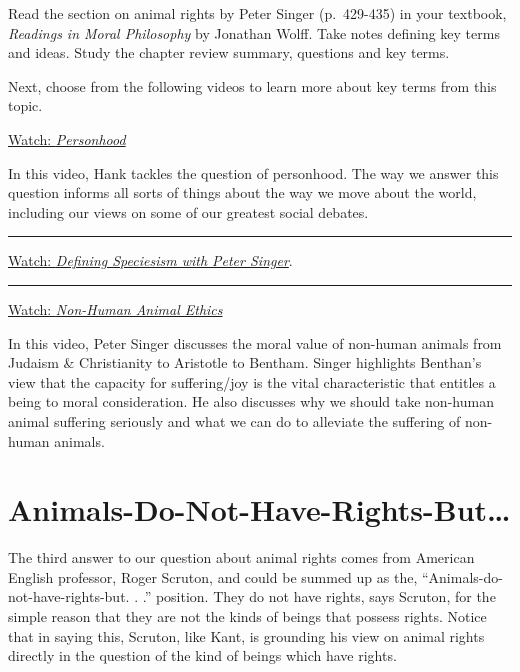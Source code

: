 \documentclass[
]{book}
\begin{document}
\begin{reflect}
Read the section on animal rights by Peter Singer (p.~429-435) in your textbook, \emph{Readings in Moral Philosophy} by Jonathan Wolff. Take notes defining key terms and ideas. Study the chapter review summary, questions and key terms.

Next, choose from the following videos to learn more about key terms from this topic.

\href{https://www.youtube.com/watch?v=GxM9BZeRrUI}{Watch: \emph{Personhood}}

In this video, Hank tackles the question of personhood. The way we answer this question informs all sorts of things about the way we move about the world, including our views on some of our greatest social debates.

\begin{center}\rule{0.5\linewidth}{0.5pt}\end{center}

\href{https://www.youtube.com/watch?v=k57F49ymmQg}{Watch: \emph{Defining Speciesism with Peter Singer}}.

\begin{center}\rule{0.5\linewidth}{0.5pt}\end{center}

\href{https://www.youtube.com/watch?v=TgRoZVT6kYc}{Watch: \emph{Non-Human Animal Ethics}}

In this video, Peter Singer discusses the moral value of non-human animals from Judaism \& Christianity to Aristotle to Bentham. Singer highlights Benthan's view that the capacity for suffering/joy is the vital characteristic that entitles a being to moral consideration. He also discusses why we should take non-human animal suffering seriously and what we can do to alleviate the suffering of non-human animals.
\end{reflect}

\hypertarget{animals-do-not-have-rights-but}{%
\section{Animals-Do-Not-Have-Rights-But\ldots{}}\label{animals-do-not-have-rights-but}}

The third answer to our question about animal rights comes from American English professor, Roger Scruton, and could be summed up as the, ``Animals-do-not-have-rights-but. . .'' position. They do not have rights, says Scruton, for the simple reason that they are not the kinds of beings that possess rights. Notice that in saying this, Scruton, like Kant, is grounding his view on animal rights directly in the question of the kind of beings which have rights.
\end{document}
